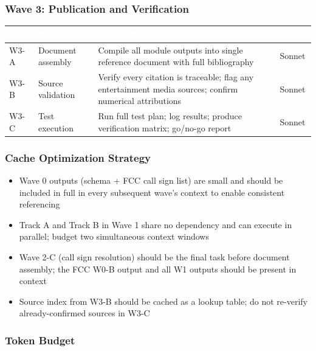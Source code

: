\documentclass[11pt,letterpaper]{article}
\newcommand{\tableheader}[1]{\textbf{\sffamily\textcolor{white}{#1}}}
\begin{document}
\subsubsection{Wave 3: Publication and Verification}

\begin{center}
\begin{tabularx}{\textwidth}{L{1.5cm}L{3.5cm}XC{1.5cm}}
\toprule
{}
\tableheader{Task} & \tableheader{Name} & \tableheader{Description} & \tableheader{Model} \\
\midrule
W3-A & Document assembly & Compile all module outputs into single reference document with full bibliography & Sonnet \\
W3-B & Source validation & Verify every citation is traceable; flag any entertainment media sources; confirm numerical attributions & Sonnet \\
W3-C & Test execution & Run full test plan; log results; produce verification matrix; go/no-go report & Sonnet \\
\bottomrule
\end{tabularx}
\end{center}

\subsubsection{Cache Optimization Strategy}

\begin{itemize}[leftmargin=2em]
  \item Wave 0 outputs (schema + FCC call sign list) are small and should be included in full in every subsequent wave's context to enable consistent referencing
  \item Track A and Track B in Wave 1 share no dependency and can execute in parallel; budget two simultaneous context windows
  \item Wave 2-C (call sign resolution) should be the final task before document assembly; the FCC W0-B output and all W1 outputs should be present in context
  \item Source index from W3-B should be cached as a lookup table; do not re-verify already-confirmed sources in W3-C
\end{itemize}

\subsubsection{Token Budget}
\end{document}
